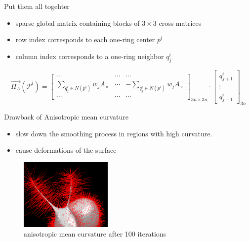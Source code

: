 \documentclass{beamer}
\begin{document}
\begin{frame}{Put them all togehter}
\begin{itemize}
\item sparse global matrix containing blocks of $3 \times 3$ cross matrices
\item row index corresponds to each one-ring center $p^i$
\item column index corresponds to a one-ring neighbor $q^i_j$
\end{itemize}
\begin{equation*}
\vec{H_A}( \mathcal{P}^i ) = 
\begin{bmatrix} 
 \cdots & \cdots & \cdots \\
 \sum\limits_{q_j^i \in N(p^i)}{w_j A_{\times}} & \cdots & -\sum\limits_{q_j^i \in N(p^i)}{w_j A_{\times}} \\
 \cdots & \cdots & \cdots 
\end{bmatrix}_{3n \times 3n} \cdot
\left[ \begin{array}{c} 
q^i_{j+1} \\ 
\vdots \\ 
q^i_{j-1} \end{array} \right]_{3n}
\end{equation*}
\end{frame}

\begin{frame}{Drawback of Anisotropic mean curvature}
\begin{itemize}
\item slow down the smoothing process in regions with high curvature. 
\item cause deformations of the surface
\end{itemize}
\begin{figure}[htb]
\centering
\includegraphics[width=0.4\textwidth]{aniso_bunny_100it.PNG}
\caption{anisotropic mean curvature after 100 iterations}
\label{fig:deform}
\end{figure}
\end{frame}
\end{document}
